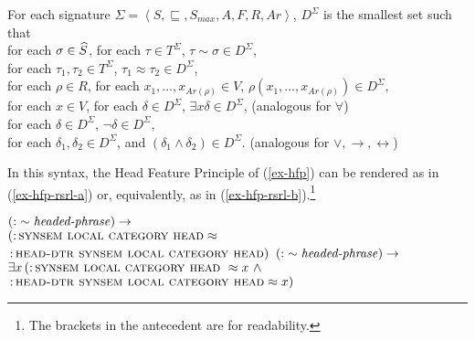 \documentclass[output=paper
 	        ,biblatex
                ,babelshorthands
                ,newtxmath
                ,draftmode
                ,colorlinks, citecolor=brown
]{langscibook}
\begin{document}
{\begin{mydef}
  For each signature $\Sigma=\left<S,\sqsubseteq,S_{max},A,F,R,Ar\right>$,
  $D^{\Sigma}$ is the smallest set such that\\
  for each $\sigma\in\widehat{S}$, for each $\tau\in T^{\Sigma}$,
  $\tau\sim\sigma\in D^{\Sigma}$,\\
  for each $\tau_1, \tau_2\in T^{\Sigma}$, $\tau_1 \approx \tau_2 \in D^{\Sigma}$,\\
  for each $\rho\in R$, for each $x_1, \ldots, x_{Ar(\rho)}\in V$,
  $\rho(x_1,\ldots,x_{Ar(\rho)})\in D^{\Sigma}$,\\
  for each $x\in V$, for each $\delta\in D^{\Sigma}$,
  $\exists x\delta\in D^{\Sigma}$, \hfill (analogous for $\forall$)\\
  for each $\delta\in D^{\Sigma}$, $\neg\delta\in D^{\Sigma}$,\\
  for each $\delta_1,\delta_2\in D^{\Sigma}$, and
  $\left(\delta_1\land\delta_2\right) \in D^{\Sigma}$.
  \hfill (analogous for $\lor,\rightarrow,\leftrightarrow$)
\end{mydef}

In this syntax, the Head Feature Principle of (\ref{ex-hfp}) can be
rendered as in (\ref{ex-hfp-rsrl-a}) or, equivalently, as in
(\ref{ex-hfp-rsrl-b}).\footnote{The brackets in the antecedent are
for readability.}

\begin{exe}
  \ex
  \begin{xlist}
  \ex\label{ex-hfp-rsrl-a}
  $\left(\operatorname{:}\sim\mbox{{\normalfont\itshape headed-phrase\/}}\right)\rightarrow$\\ %
  $\left(\operatorname{:}\textsc{synsem local category head}\approx\right.$\\
 \hspace*{.1em} $\left.\operatorname{:}\textsc{head-dtr synsem local category head}\right)$
  \ex\label{ex-hfp-rsrl-b}
   $\left(\operatorname{:}\sim\mbox{{\normalfont\itshape headed-phrase\/}}\right)\rightarrow$\\ %
  $\exists x\left(\operatorname{:}\textsc{synsem local category head}~\approx x\ \wedge\right.$\\
\hspace*{1.2em}  $\left.\operatorname{:}\textsc{head-dtr synsem local category head}\approx x\right)$
  \end{xlist}
\end{exe}

}
\end{document}

